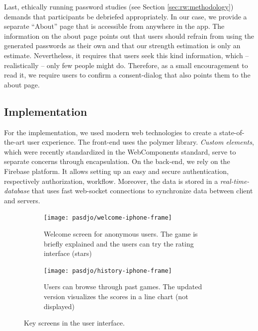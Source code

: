 Last, ethically running password studies (see Section \ref{sec:rw:methodology}) demands that participants be debriefed appropriately. In our case, we provide a separate ``About'' page that is accessible from anywhere in the app. The information on the about page points out that users should refrain from using the generated passwords as their own and that our strength estimation is only an estimate. Nevertheless, it requires that users seek this kind information, which -- realistically -- only few people might do. Therefore, as a small encouragement to read it, we require users to confirm a consent-dialog that also points them to the about page. 

\subsection{Implementation}
For the implementation, we used modern web technologies to create a state-of-the-art user experience. The front-end uses the polymer library. \textit{Custom elements}, which were recently standardized in the WebComponents standard, serve to separate concerns through encapsulation. On the back-end, we rely on the Firebase platform. It allows setting up an easy and secure authentication, respectively authorization, workflow. Moreover, the data is stored in a \textit{real-time-database} that uses fast web-socket connections to synchronize data between client and servers.

\begin{figure}[!tbp]
	\centering
	\begin{subfigure}[t]{0.3\linewidth}
		\texttt{[image: pasdjo/welcome-iphone-frame]}
		\caption{\label{fig:pasdjo:welcome-screen}Welcome screen for anonymous users. The game is briefly explained and the users can try the rating interface (stars)}
	\end{subfigure}
	\begin{subfigure}[t]{0.3\linewidth}
		\texttt{[image: pasdjo/history-iphone-frame]}
		\caption{\label{fig:pasdjo:history-screen}Users can browse through past games. The updated version visualizes the scores in a line chart (not displayed)}
	\end{subfigure}
	\caption{\label{fig:pasdjo:welcome-history}Key screens in the user interface.}
\end{figure}

